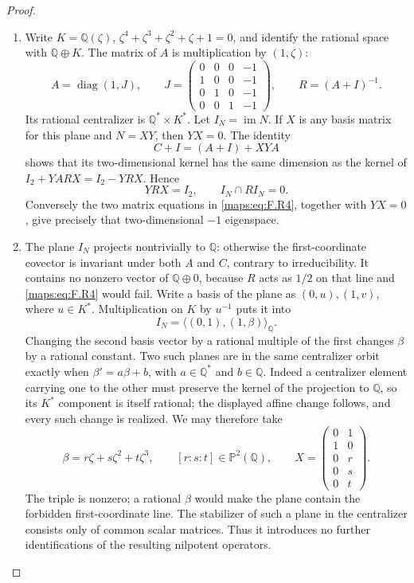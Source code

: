 \documentclass[11pt,a4paper]{article}
\theoremstyle{definition}
\begin{document}
\begin{proof}
\begin{enumerate}[label=\arabic*.]
\item Write $K=\mathbb Q(\zeta)$, $\zeta^4+\zeta^3+\zeta^2+
\zeta+1=0$, and identify the rational space with
$\mathbb Q\oplus K$.  The matrix of $A$ is multiplication by
$(1,\zeta)$:
\[
 A=\operatorname{diag}(1,J),\qquad
 J=\begin{pmatrix}
 0&0&0&-1\\1&0&0&-1\\0&1&0&-1\\0&0&1&-1
 \end{pmatrix},\qquad R=(A+I)^{-1}.
 \tag{F.R3}\label{maps:eq:F.R3}
\]
Its rational centralizer is $\mathbb Q^*\times K^*$.
Let $I_N=\operatorname{im}N$.  If $X$ is any basis matrix
for this plane and $N=XY$, then $YX=0$.
The identity
\[
 C+I=(A+I)+XYA
\]
shows that its two-dimensional kernel has the same dimension
as the kernel of
$I_2+YARX=I_2-YRX$.  Hence
\[
 YRX=I_2,
 \qquad I_N\cap RI_N=0.
 \tag{F.R4}\label{maps:eq:F.R4}
\]
Conversely the two matrix equations in \eqref{maps:eq:F.R4}, together with
$YX=0$, give precisely that two-dimensional $-1$ eigenspace.

\item The plane $I_N$ projects nontrivially to $\mathbb Q$:
otherwise the first-coordinate covector is invariant under
both $A$ and $C$, contrary to irreducibility.
It contains no nonzero vector of $\mathbb Q\oplus0$,
because $R$ acts as $1/2$ on that line and \eqref{maps:eq:F.R4} would fail.
Write a basis of the plane as $(0,u),(1,v)$, where
$u\in K^*$.  Multiplication on $K$ by $u^{-1}$ puts it into
\[
 I_N=\langle(0,1),(1,\beta)\rangle_{\mathbb Q}.
\]
Changing the second basis vector by a rational multiple of
the first changes $\beta$ by a rational constant.
Two such planes are in the same centralizer orbit exactly
when $\beta'=a\beta+b$, with $a\in\mathbb Q^*$ and
$b\in\mathbb Q$.  Indeed a centralizer element carrying
one to the other must preserve the kernel of the projection
to $\mathbb Q$, so its $K^*$ component is itself rational;
the displayed affine change follows, and every such change
is realized.  We may therefore take
\[
 \beta=r\zeta+s\zeta^2+t\zeta^3,
 \qquad [r:s:t]\in\mathbb P^2(\mathbb Q),
 \qquad
 X=\begin{pmatrix}0&1\\1&0\\0&r\\0&s\\0&t\end{pmatrix}.
 \tag{F.R5}\label{maps:eq:F.R5}
\]
The triple is nonzero; a rational $\beta$ would make the
plane contain the forbidden first-coordinate line.
The stabilizer of such a plane in the centralizer consists
only of common scalar matrices.  Thus it introduces no
further identifications of the resulting nilpotent operators.


\end{enumerate}
\end{proof}
\end{document}
